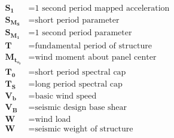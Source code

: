 \begin{align*}
    \bm{S_1}     & = \textrm{1 second period mapped acceleration}     \\
    \bm{S_M_S}   & = \textrm{short period parameter}                  \\
    \bm{S_M_1}   & = \textrm{1 second period parameter}               \\
    \bm{T}       & = \textrm{fundamental period of structure}         \\
    \bm{M_t_o_r} & = \textrm{wind moment about panel center }         \\
    \bm{T_0}     & = \textrm{short period spectral cap }              \\
    \bm{T_S}     & = \textrm{long period spectral cap}                \\
    \bm{V_b}     & = \textrm{basic wind speed}                        \\
    \bm{V_B}     & = \textrm{seismic design base shear}               \\
    \bm{W}       & = \textrm{wind load}                               \\
    \bm{W}       & = \textrm{seismic weight of structure }            \\
\end{align*}
